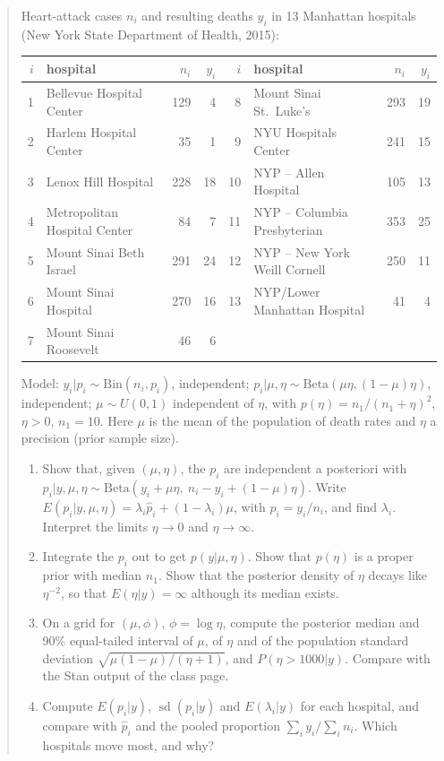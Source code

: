 \documentclass[11pt,a4paper]{article}
\newenvironment{enunciado}{\begin{quote}}{\end{quote}}
\begin{document}
\begin{enunciado}
Heart-attack cases $n_i$ and resulting deaths $y_i$ in 13 Manhattan hospitals (New York State Department of Health, 2015):
\begin{center}\footnotesize\setlength{\tabcolsep}{4pt}
\begin{tabular}{rlrr@{\quad}rlrr}
\toprule
$i$ & hospital & $n_i$ & $y_i$ & $i$ & hospital & $n_i$ & $y_i$\\
\midrule
1 & Bellevue Hospital Center & 129 & 4 & 8 & Mount Sinai St.\ Luke's & 293 & 19\\
2 & Harlem Hospital Center & 35 & 1 & 9 & NYU Hospitals Center & 241 & 15\\
3 & Lenox Hill Hospital & 228 & 18 & 10 & NYP -- Allen Hospital & 105 & 13\\
4 & Metropolitan Hospital Center & 84 & 7 & 11 & NYP -- Columbia Presbyterian & 353 & 25\\
5 & Mount Sinai Beth Israel & 291 & 24 & 12 & NYP -- New York Weill Cornell & 250 & 11\\
6 & Mount Sinai Hospital & 270 & 16 & 13 & NYP/Lower Manhattan Hospital & 41 & 4\\
7 & Mount Sinai Roosevelt & 46 & 6 & & & &\\
\bottomrule
\end{tabular}
\end{center}
Model: $y_i|p_i\sim\text{Bin}(n_i,p_i)$, independent; $p_i|\mu,\eta\sim\text{Beta}(\mu\eta,(1-\mu)\eta)$, independent; $\mu\sim U(0,1)$ independent of $\eta$, with $p(\eta)=n_1/(n_1+\eta)^2$, $\eta>0$, $n_1=10$. Here $\mu$ is the mean of the population of death rates and $\eta$ a precision (prior sample size).
\begin{enumerate}[label=\textbf{(\alph*)},leftmargin=2em]
\item Show that, given $(\mu,\eta)$, the $p_i$ are independent a posteriori with $p_i|y,\mu,\eta\sim\text{Beta}(y_i+\mu\eta,\ n_i-y_i+(1-\mu)\eta)$. Write $E(p_i|y,\mu,\eta)=\lambda_i\hat p_i+(1-\lambda_i)\mu$, with $\hat p_i=y_i/n_i$, and find $\lambda_i$. Interpret the limits $\eta\to0$ and $\eta\to\infty$.
\item Integrate the $p_i$ out to get $p(y|\mu,\eta)$. Show that $p(\eta)$ is a proper prior with median $n_1$. Show that the posterior density of $\eta$ decays like $\eta^{-2}$, so that $E(\eta|y)=\infty$ although its median exists.
\item On a grid for $(\mu,\phi)$, $\phi=\log\eta$, compute the posterior median and 90\% equal-tailed interval of $\mu$, of $\eta$ and of the population standard deviation $\sqrt{\mu(1-\mu)/(\eta+1)}$, and $P(\eta>1000|y)$. Compare with the Stan output of the class page.
\item Compute $E(p_i|y)$, $\operatorname{sd}(p_i|y)$ and $E(\lambda_i|y)$ for each hospital, and compare with $\hat p_i$ and the pooled proportion $\sum_iy_i/\sum_in_i$. Which hospitals move most, and why?
\end{enumerate}
\end{enunciado}
\end{document}
